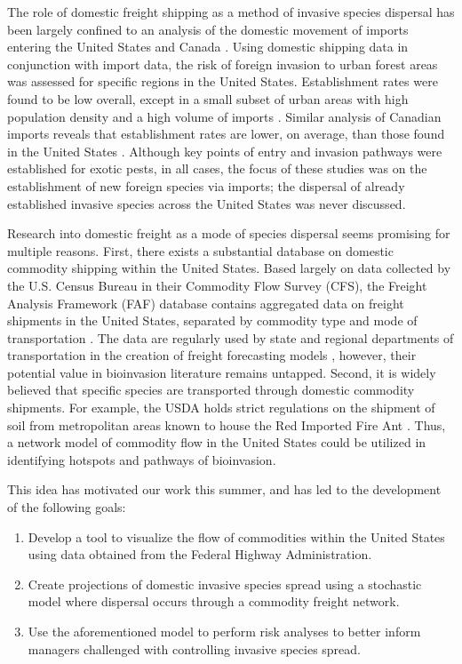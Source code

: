 \documentclass[12pt]{article}
\begin{document}
The role of domestic freight shipping as a method of invasive species dispersal has been largely confined to an analysis of the domestic movement of imports entering the United States and Canada \citep{Koch2011, Colunga2009, Yemshanov2013}.  Using domestic shipping data in conjunction with import data, the risk of foreign invasion to urban forest areas was assessed for specific regions in the United States.  Establishment rates were found to be low overall, except in a small subset of urban areas with high population density and a high volume of imports \citep{Colunga2009, Koch2011}.  Similar analysis of Canadian imports reveals that establishment rates are lower, on average, than those found in the United States \citep{Yemshanov2013}.  Although key points of entry and invasion pathways were established for exotic pests, in all cases, the focus of these studies was on the establishment of new foreign species via imports; the dispersal of already established invasive species across the United States was never discussed.  

Research into domestic freight as a mode of species dispersal seems promising for multiple reasons.  First, there exists a substantial database on domestic commodity shipping within the United States.  Based largely on data collected by the U.S. Census Bureau in their Commodity Flow Survey (CFS), the Freight Analysis Framework (FAF) database contains aggregated data on freight shipments in the United States, separated by commodity type and mode of transportation \citep{FAF3manual, FAFwebsite}.  The data are regularly used by state and regional departments of transportation in the creation of freight forecasting models \citep{NCHRP, Chow2010, Sivakumar2002}, however, their potential value in bioinvasion literature remains untapped.  Second, it is widely believed that specific species are transported through domestic commodity shipments. For example, the USDA holds strict regulations on the shipment of soil from metropolitan areas known to house the Red Imported Fire Ant \citep{USDA}.  Thus, a network model of commodity flow in the United States could be utilized in identifying hotspots and pathways of bioinvasion. 

This idea has motivated our work this summer, and has led to the development of the following goals:

\begin{enumerate}

\item Develop a tool to visualize the flow of commodities within the United States using data obtained from the Federal Highway Administration.

\item Create projections of domestic invasive species spread using a stochastic model where dispersal occurs through a commodity freight network.

\item Use the aforementioned model to perform risk analyses to better inform managers challenged with controlling invasive species spread.

\end{enumerate}
\end{document}
